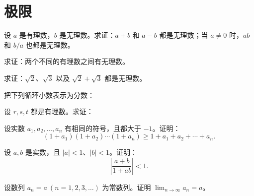 \renewcommand{\thesection}{\arabic{section}}\renewcommand{\theHsection}{chapter.\arabic{section}}\setcounter{section}{0}\section{极限}
\noindent\begin{minipage}{\textwidth}
设 $a$ 是有理数，$b$ 是无理数。求证：$a+b$ 和 $a-b$ 都是无理数；当 $a\ne0$ 时，$ab$ 和 $b/a$ 也都是无理数。
\end{minipage}\par\vfill
\noindent\begin{minipage}{\textwidth}
求证：两个不同的有理数之间有无理数。
\end{minipage}\par\vfill
\noindent\begin{minipage}{\textwidth}
求证：$\sqrt2$、$\sqrt3$ 以及 $\sqrt2+\sqrt3$ 都是无理数。
\end{minipage}\par\vfill
\noindent\begin{minipage}{\textwidth}
把下列循环小数表示为分数：
\end{minipage}\par\vfill
\newpage
\noindent\begin{minipage}{\textwidth}
设 $r,s,t$ 都是有理数。求证：
\end{minipage}\par\vfill
\noindent\begin{minipage}{\textwidth}
设实数 $a_1,a_2,\ldots,a_n$ 有相同的符号，且都大于 $-1$。证明：\[(1+a_1)(1+a_2)\cdots(1+a_n)\ge1+a_1+a_2+\cdots+a_n.\]
\end{minipage}\par\vfill
\noindent\begin{minipage}{\textwidth}
设 $a,b$ 是实数，且 $|a|<1$、$|b|<1$。证明：\[\left|\frac{a+b}{1+ab}\right|<1.\]
\end{minipage}\par\vfill
\noindent\begin{minipage}{\textwidth}
设数列 $a_n=a\ (n=1,2,3,\ldots)$ 为常数列。证明 $\displaystyle\lim_{n\to\infty}a_n=a$。
\end{minipage}\par\vfill
